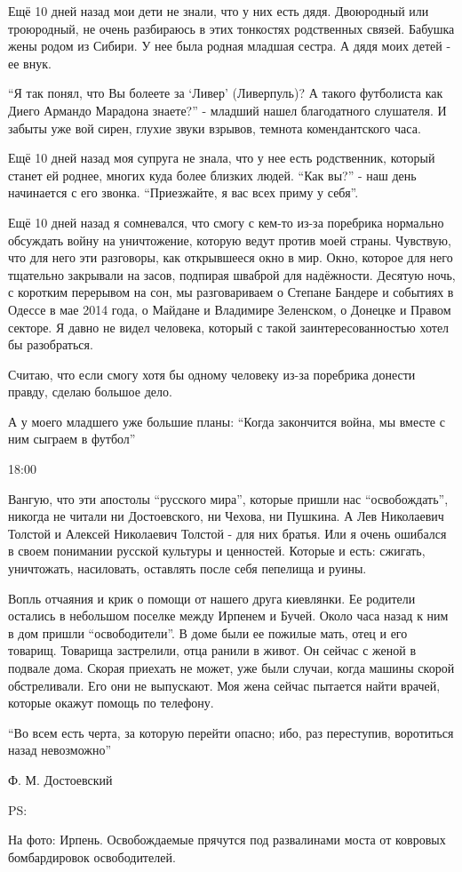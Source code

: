 Ещё 10 дней назад мои дети не знали, что у них есть дядя. Двоюродный или
троюродный, не очень разбираюсь в этих тонкостях родственных связей. Бабушка
жены родом из Сибири. У нее была родная младшая сестра. А дядя моих детей - ее
внук. 


\enquote{Я так понял, что Вы болеете за \enquote{Ливер} (Ливерпуль)? А такого
футболиста как Диего Армандо Марадона знаете?} - младший нашел благодатного
слушателя. И забыты уже вой сирен, глухие звуки взрывов, темнота комендантского
часа.

Ещё 10 дней назад моя супруга не знала, что у нее есть родственник, который
станет ей роднее, многих куда более близких людей. \enquote{Как вы?} - наш день
начинается с его звонка. \enquote{Приезжайте, я вас всех приму у себя}.

Ещё 10 дней назад я сомневался, что смогу с кем-то из-за поребрика нормально
обсуждать войну на уничтожение, которую ведут против моей страны. Чувствую, что
для него эти разговоры, как открывшееся окно в мир. Окно, которое для него
тщательно закрывали на засов, подпирая шваброй для надёжности. Десятую ночь, с
коротким перерывом на сон, мы разговариваем о Степане Бандере и событиях в
Одессе в мае 2014 года, о Майдане и Владимире Зеленском, о Донецке и Правом
секторе. Я давно не видел человека, который с такой заинтересованностью хотел
бы разобраться. 

Считаю, что если смогу хотя бы одному человеку из-за поребрика донести правду,
сделаю большое дело.

А у моего младшего уже большие планы: \enquote{Когда закончится война, мы вместе с ним
сыграем в футбол} 

18:00

Вангую, что эти апостолы \enquote{русского мира}, которые пришли нас \enquote{освобождать},
никогда не читали ни Достоевского, ни Чехова, ни Пушкина. А Лев Николаевич
Толстой и Алексей Николаевич Толстой - для них братья. Или я очень ошибался в
своем понимании русской культуры и ценностей. Которые и есть: сжигать,
уничтожать, насиловать, оставлять после себя пепелища и руины.

Вопль отчаяния и крик о помощи от нашего друга киевлянки. Ее родители остались
в небольшом поселке между Ирпенем и Бучей. Около часа назад к ним в дом пришли
\enquote{освободители}. В доме были ее пожилые мать, отец и его товарищ. Товарища
застрелили, отца ранили в живот. Он сейчас с женой в подвале дома. Скорая
приехать не может, уже были случаи, когда машины скорой обстреливали. Его они
не выпускают. Моя жена сейчас пытается найти врачей, которые окажут помощь по
телефону.

\enquote{Во всем есть черта, за которую перейти опасно; ибо, раз переступив, воротиться
назад невозможно}

Ф. М. Достоевский

PS:

На фото: Ирпень. Освобождаемые прячутся под развалинами моста от ковровых
бомбардировок освободителей.
